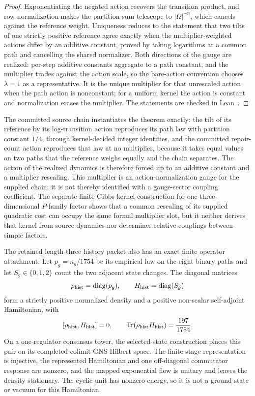\documentclass[11pt]{article}
\begin{document}
\begin{proof}
Exponentiating the negated action recovers the transition product, and row
normalization makes the partition sum telescope to \(|\Omega|^{-n}\), which
cancels against the reference weight.  Uniqueness reduces to the statement
that two tilts of one strictly positive reference agree exactly when the
multiplier-weighted actions differ by an additive constant, proved by taking
logarithms at a common path and cancelling the shared normalizer.  Both
directions of the gauge are realized: per-step additive constants aggregate
to a path constant, and the multiplier trades against the action scale, so
the bare-action convention chooses \(\lambda=1\) as a representative.  It is
the unique multiplier for that unrescaled action when the path action is
nonconstant; for a uniform kernel the action is constant and normalization
erases the multiplier.  The statements are checked
in Lean~\cite{ophrepo}.
\end{proof}

The committed source chain instantiates the theorem exactly: the tilt of its
reference by its log-transition action reproduces its path law with partition
constant \(1/4\), through kernel-decided integer identities, and the
committed repair-count action reproduces that law at no multiplier, because
it takes equal values on two paths that the reference weighs equally and the
chain separates.  The action of the realized dynamics is therefore forced up
to an additive constant and a multiplier rescaling.  This multiplier is an
action-normalization gauge for the supplied chain; it is not thereby
identified with a gauge-sector coupling coefficient.  The separate finite
Gibbs-kernel construction for one three-dimensional \(P\)-family factor shows
that a common rescaling of its supplied quadratic cost can occupy the same
formal multiplier slot, but it neither derives that kernel from source
dynamics nor determines relative couplings between simple factors.

The retained length-three history packet also has an exact finite operator
attachment.  Let \(p_g=n_g/1754\) be its empirical law on the eight binary
paths and let \(S_g\in\{0,1,2\}\) count the two adjacent state changes.
The diagonal matrices
\[
 \rho_{\rm hist}=\operatorname{diag}(p_g),
 \qquad H_{\rm hist}=\operatorname{diag}(S_g)
\]
form a strictly positive normalized density and a positive non-scalar
self-adjoint Hamiltonian, with
\[
 [\rho_{\rm hist},H_{\rm hist}]=0,
 \qquad
 \operatorname{Tr}(\rho_{\rm hist}H_{\rm hist})=\frac{197}{1754}.
\]
On a one-regulator consensus tower, the selected-state construction places
this pair on its completed-colimit GNS Hilbert space.  The finite-stage
representation is injective, the represented Hamiltonian and one
off-diagonal commutator response are nonzero, and the mapped exponential flow
is unitary and leaves the density stationary.  The cyclic unit has nonzero
energy, so it is not a ground state or vacuum for this Hamiltonian.
\end{document}

